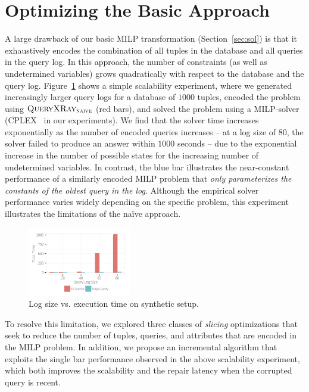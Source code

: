 
\section{Optimizing the Basic Approach}
\label{sec:opt}

A large drawback of our basic MILP transformation (Section~\ref{sec:sol}) is
that it exhaustively encodes the combination of all tuples in the database and all queries
in the query log.  In this approach, the number of constraints (as well as undetermined variables) 
grows quadratically with respect to the database and the query log.
Figure~\ref{fig:querysize_vs_time} shows a simple scalability experiment, where we generated increasingly 
larger query logs for a database of $1000$ tuples, encoded the problem using $\naive$ (red bars), 
and solved the problem using a MILP-solver (CPLEX~\cite{cplex} in our experiments).
We find that the solver time increases exponentially as the number of encoded queries increases --
at a log size of $80$, the solver failed to produce an answer within $1000$ seconds --
due to the exponential increase in the number of possible states for the increasing number of undetermined variables.
In contrast, the blue bar illustrates the near-constant performance of a similarly encoded MILP problem that 
{\it only parameterizes the constants of the oldest query in the log}.
Although the empirical solver performance varies widely depending on the specific problem, 
this experiment illustrates the limitations of the na\"ive approach.

\begin{figure}[t]
    \centering
        \includegraphics[width=0.4\textwidth]{figures/qsize_time_badscale}
    \caption{Log size vs. execution time on synthetic setup. }
    \label{fig:querysize_vs_time}
\end{figure}

To resolve this limitation, we explored three classes of \emph{slicing} optimizations that seek to
reduce the number of tuples, queries, and attributes that are encoded in the MILP problem.
In addition, we propose an incremental algorithm that exploits the single bar performance observed
in the above scalability experiment, which both improves the scalability and the repair latency
when the corrupted query is recent.  




